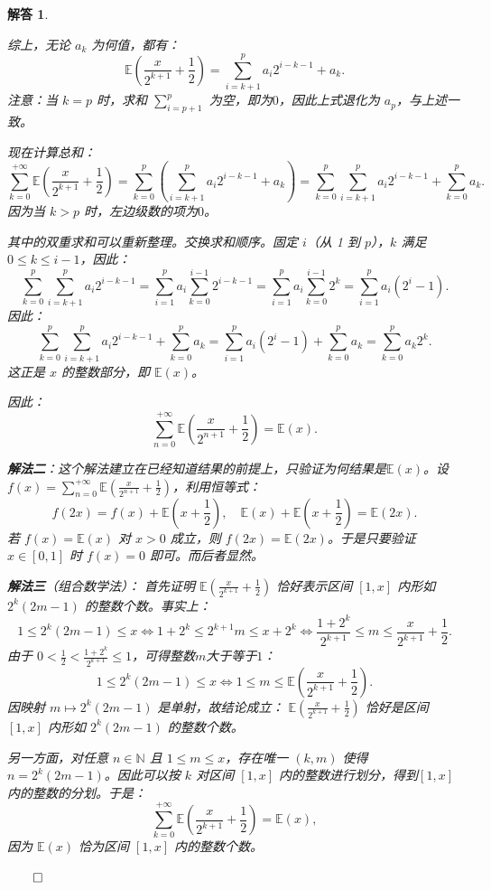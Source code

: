 \documentclass[12pt,UTF8,fontset=none]{ctexbook}
\theoremstyle{exercisestyle}
\theoremstyle{solutionstyle}
\newtheorem*{solution*}{解答}
\newenvironment{solution}
  {\begin{solution*}}
  {\hfill\ensuremath{\qed}\end{solution*}}
\begin{document}
\begin{solution}
\begin{subquestions}
综上，无论 $a_k$ 为何值，都有：
$$
\mathbb{E}\left(\frac{x}{2^{k+1}} + \frac{1}{2}\right) = \sum_{i=k+1}^{p} a_i 2^{i - k - 1} + a_k.
$$
注意：当 $k = p$ 时，求和 $\sum_{i=p+1}^{p}$ 为空，即为$0$，因此上式退化为 $a_p$，与上述一致。

现在计算总和：
$$
\sum_{k=0}^{+\infty} \mathbb{E}\left(\frac{x}{2^{k+1}} + \frac{1}{2}\right) = \sum_{k=0}^{p} \left( \sum_{i=k+1}^{p} a_i 2^{i - k - 1} + a_k \right) = \sum_{k=0}^{p} \sum_{i=k+1}^{p} a_i 2^{i - k - 1} + \sum_{k=0}^{p} a_k.
$$
因为当 $k > p$ 时，左边级数的项为$0$。

其中的双重求和可以重新整理。交换求和顺序。固定 $i$（从 1 到 $p$），$k$ 满足 $0 \leq k \leq i-1$，因此：
$$
\sum_{k=0}^{p} \sum_{i=k+1}^{p} a_i 2^{i - k - 1} = \sum_{i=1}^{p} a_i \sum_{k=0}^{i-1} 2^{i - k - 1} = \sum_{i=1}^{p} a_i \sum_{k=0}^{i-1} 2^k = \sum_{i=1}^{p} a_i\left(2^i - 1\right).
$$
因此：
$$
\sum_{k=0}^{p} \sum_{i=k+1}^{p} a_i 2^{i - k - 1} + \sum_{k=0}^{p} a_k = \sum_{i=1}^{p} a_i\left(2^i - 1\right) + \sum_{k=0}^{p} a_k = \sum_{k=0}^{p} a_k 2^k.
$$
这正是 $x$ 的整数部分，即 $\mathbb{E}(x)$。

因此：
$$
\sum_{n=0}^{+\infty} \mathbb{E}\left(\frac{x}{2^{n+1}} + \frac{1}{2}\right) = \mathbb{E}(x).
$$

\item \textbf{解法二}：这个解法建立在已经知道结果的前提上，只验证为何结果是$\mathbb{E}(x)$。设 $f(x) = \sum_{n=0}^{+\infty} \mathbb{E}\left(\frac{x}{2^{n+1}} + \frac{1}{2}\right)$，利用恒等式：
$$
f(2x) = f(x) + \mathbb{E}\left(x + \frac{1}{2}\right), \quad \mathbb{E}(x) + \mathbb{E}\left(x + \frac{1}{2}\right) = \mathbb{E}(2x).
$$
若 $f(x) = \mathbb{E}(x)$ 对 $x > 0$ 成立，则 $f(2x) = \mathbb{E}(2x)$。于是只要验证 $x \in [0,1]$ 时 $f(x) = 0$ 即可。而后者显然。

\item \textbf{解法三}（组合数学法）：
首先证明 $\mathbb{E}\left(\frac{x}{2^{k+1}} + \frac{1}{2}\right)$ 恰好表示区间 $[1,x]$ 内形如 $ 2^{k}(2m - 1)$ 的整数个数。事实上：
$$
1 \leqslant 2^{k}(2m-1) \leqslant x 
\Longleftrightarrow 1 + 2^{k} \leqslant 2^{k+1}m \leqslant x + 2^{k}
\iff \frac{1 + 2^{k}}{2^{k+1}} \leqslant m \leqslant \frac{x}{2^{k+1}} + \frac{1}{2}.
$$
由于 $\displaystyle 0 < \frac{1}{2} < \frac{1+2^k}{2^{k+1}} \leqslant 1$，可得整数$m$大于等于$1$：
$$
1 \leqslant 2^{k}(2m-1) \leqslant x 
\Longleftrightarrow 1 \leqslant m \leqslant \mathbb{E}\left(\frac{x}{2^{k+1}} + \frac{1}{2}\right).
$$
因映射 $m \mapsto 2^k(2m-1)$ 是单射，故结论成立： $\mathbb{E}\left(\frac{x}{2^{k+1}} + \frac{1}{2}\right)$ 恰好是区间 $[1,x]$ 内形如 $ 2^{k}(2m - 1)$ 的整数个数。

另一方面，对任意 $n \in \mathbb{N}$ 且 $1 \leqslant m \leqslant x$，存在唯一 $(k, m)$ 使得 $n = 2^{k}(2m - 1)$。因此可以按 $k$ 对区间 $[1,x]$ 内的整数进行划分，得到$[1,x]$ 内的整数的分划。于是：
$$
\sum_{k=0}^{+\infty} \mathbb{E}\left(\frac{x}{2^{k+1}} + \frac{1}{2}\right) = \mathbb{E}(x),
$$
因为 $\mathbb{E}(x)$ 恰为区间 $[1,x]$ 内的整数个数。
\end{subquestions}
\end{solution}
\end{document}
